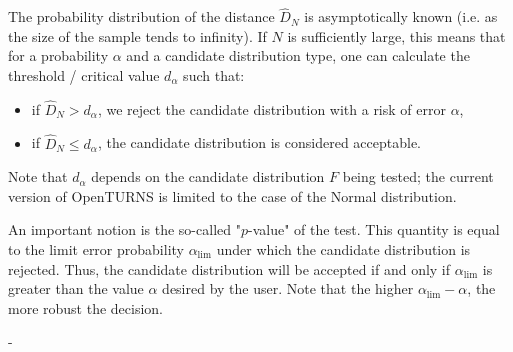 {  The probability distribution of the distance $\widehat{D}_N$ is asymptotically known (i.e. as the size of the sample tends to infinity). If $N$ is sufficiently large, this means that for a probability $\alpha$ and a candidate distribution type, one can calculate the threshold / critical value $d_\alpha$ such that:
  \begin{itemize}
  \item if  $\widehat{D}_N>d_{\alpha}$, we reject the candidate distribution with a risk of error $\alpha$,
  \item if  $\widehat{D}_N \leq d_{\alpha}$, the candidate distribution is considered acceptable.
  \end{itemize}
  Note that $d_\alpha$ depends on the candidate distribution $F$ being tested; the current version of OpenTURNS is limited to the case of the Normal distribution.

  An important notion is the so-called "$p$-value" of the test. This quantity is equal to the limit error probability $\alpha_\textrm{lim}$ under which the candidate distribution is rejected. Thus, the candidate distribution will be accepted if and only if $\alpha_\textrm{lim}$ is greater than the value $\alpha$ desired by the user. Note that the higher $\alpha_\textrm{lim} - \alpha$, the more robust the decision.

}
{
  -
}

